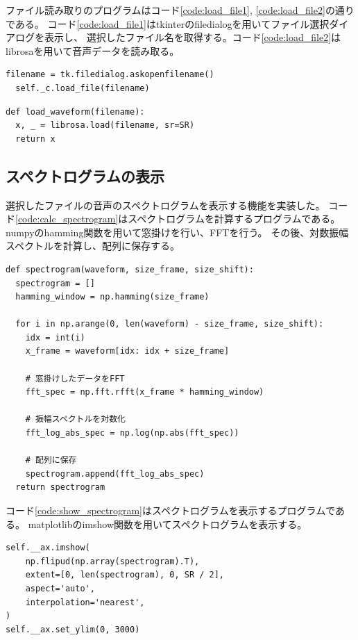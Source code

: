 \documentclass[a4paper,11pt]{jsarticle}
\begin{document}
ファイル読み取りのプログラムはコード\ref{code:load_file1}, \ref{code:load_file2}の通りである。
コード\ref{code:load_file1}はtkinterのfiledialogを用いてファイル選択ダイアログを表示し、
選択したファイル名を取得する。コード\ref{code:load_file2}はlibrosaを用いて音声データを読み取る。

\begin{lstlisting}[caption=ファイル読み取り1,label=code:load_file1]
  filename = tk.filedialog.askopenfilename()
  self._c.load_file(filename)
\end{lstlisting}

\begin{lstlisting}[caption=ファイル読み取り2,label=code:load_file2]
def load_waveform(filename):
  x, _ = librosa.load(filename, sr=SR)
  return x
\end{lstlisting}

\subsection{スペクトログラムの表示}
選択したファイルの音声のスペクトログラムを表示する機能を実装した。
コード\ref{code:calc_spectrogram}はスペクトログラムを計算するプログラムである。
numpyのhamming関数を用いて窓掛けを行い、FFTを行う。
その後、対数振幅スペクトルを計算し、配列に保存する。

\begin{lstlisting}[caption=スペクトログラム計算,label=code:calc_spectrogram]
def spectrogram(waveform, size_frame, size_shift):
  spectrogram = []
  hamming_window = np.hamming(size_frame)

  for i in np.arange(0, len(waveform) - size_frame, size_shift):
    idx = int(i)
    x_frame = waveform[idx: idx + size_frame]

    # 窓掛けしたデータをFFT
    fft_spec = np.fft.rfft(x_frame * hamming_window)

    # 振幅スペクトルを対数化
    fft_log_abs_spec = np.log(np.abs(fft_spec))

    # 配列に保存
    spectrogram.append(fft_log_abs_spec)
  return spectrogram
\end{lstlisting}

コード\ref{code:show_spectrogram}はスペクトログラムを表示するプログラムである。
matplotlibのimshow関数を用いてスペクトログラムを表示する。
\begin{lstlisting}[caption=スペクトログラム表示,label=code:show_spectrogram]
self.__ax.imshow(
    np.flipud(np.array(spectrogram).T),
    extent=[0, len(spectrogram), 0, SR / 2],
    aspect='auto',
    interpolation='nearest',
)
self.__ax.set_ylim(0, 3000)
\end{lstlisting}
\end{document}
